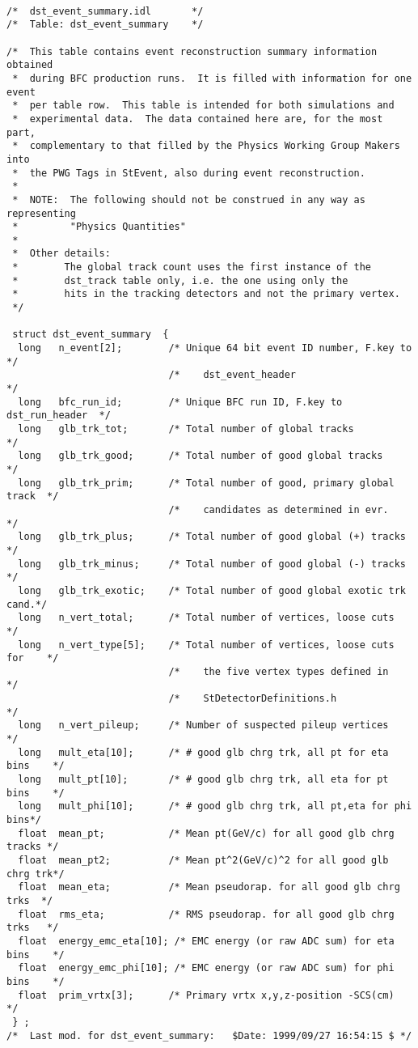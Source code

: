 \begin{verbatim}

/*  dst_event_summary.idl       */
/*  Table: dst_event_summary    */

/*  This table contains event reconstruction summary information obtained
 *  during BFC production runs.  It is filled with information for one event
 *  per table row.  This table is intended for both simulations and 
 *  experimental data.  The data contained here are, for the most part,
 *  complementary to that filled by the Physics Working Group Makers into
 *  the PWG Tags in StEvent, also during event reconstruction.
 *
 *  NOTE:  The following should not be construed in any way as representing 
 *         "Physics Quantities"
 *
 *  Other details:
 *        The global track count uses the first instance of the 
 *        dst_track table only, i.e. the one using only the 
 *        hits in the tracking detectors and not the primary vertex.
 */

 struct dst_event_summary  {
  long   n_event[2];        /* Unique 64 bit event ID number, F.key to     */
                            /*    dst_event_header                         */
  long   bfc_run_id;        /* Unique BFC run ID, F.key to dst_run_header  */
  long   glb_trk_tot;       /* Total number of global tracks               */
  long   glb_trk_good;      /* Total number of good global tracks          */
  long   glb_trk_prim;      /* Total number of good, primary global track  */
                            /*    candidates as determined in evr.         */
  long   glb_trk_plus;      /* Total number of good global (+) tracks      */
  long   glb_trk_minus;     /* Total number of good global (-) tracks      */
  long   glb_trk_exotic;    /* Total number of good global exotic trk cand.*/
  long   n_vert_total;      /* Total number of vertices, loose cuts        */
  long   n_vert_type[5];    /* Total number of vertices, loose cuts for    */
                            /*    the five vertex types defined in         */
                            /*    StDetectorDefinitions.h                  */
  long   n_vert_pileup;     /* Number of suspected pileup vertices         */
  long   mult_eta[10];      /* # good glb chrg trk, all pt for eta bins    */
  long   mult_pt[10];       /* # good glb chrg trk, all eta for pt bins    */
  long   mult_phi[10];      /* # good glb chrg trk, all pt,eta for phi bins*/
  float  mean_pt;           /* Mean pt(GeV/c) for all good glb chrg tracks */
  float  mean_pt2;          /* Mean pt^2(GeV/c)^2 for all good glb chrg trk*/
  float  mean_eta;          /* Mean pseudorap. for all good glb chrg trks  */
  float  rms_eta;           /* RMS pseudorap. for all good glb chrg trks   */
  float  energy_emc_eta[10]; /* EMC energy (or raw ADC sum) for eta bins    */
  float  energy_emc_phi[10]; /* EMC energy (or raw ADC sum) for phi bins    */
  float  prim_vrtx[3];      /* Primary vrtx x,y,z-position -SCS(cm)        */
 } ;
/*  Last mod. for dst_event_summary:   $Date: 1999/09/27 16:54:15 $ */

\end{verbatim}

